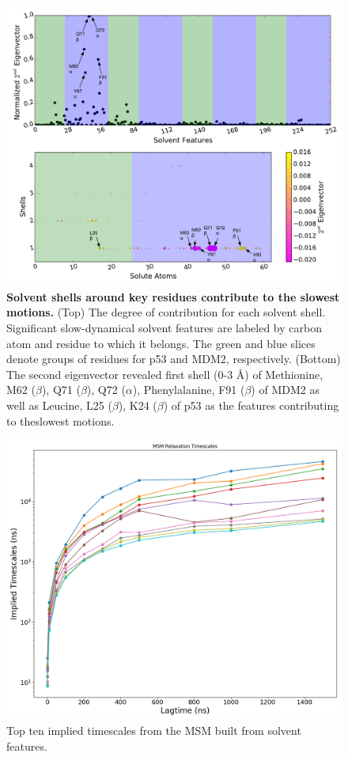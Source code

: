 \begin{figure}[h!]
\centering
\includegraphics[scale=0.5]{Figures/SI/Solvent_Shell_Feature_Eigen_2}
\caption{\textbf{Solvent shells around key residues contribute to the slowest motions.} (Top) The degree of contribution for each solvent shell. Significant slow-dynamical solvent features are labeled by carbon atom and residue to which it belongs. The green and blue slices denote groups of residues for p53 and MDM2, respectively. (Bottom)  The second eigenvector revealed first shell (0-3 Å) of Methionine, M62 ($\beta$), Q71 ($\beta$), Q72 ($\alpha$), Phenylalanine, F91 ($\beta$) of MDM2 as well as Leucine, L25 ($\beta$), K24 ($\beta$) of p53 as the features contributing to theslowest motions.}
\label{fig:2nd_eigenvector}
\end{figure}


\begin{figure}[h!]
\centering
\includegraphics[scale=0.5]{Figures/Implied_timescales/solvent_lag_50_clusters_600.png}
\caption{Top ten implied timescales from the MSM built from solvent features.
}
\label{fig:implied_timescales}
\end{figure}





